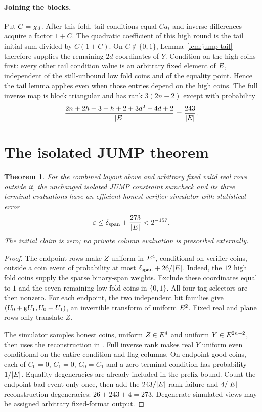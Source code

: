 \documentclass[11pt]{article}
\newtheorem{theorem}[lemma]{Theorem}
\begin{document}
\paragraph{Joining the blocks.} Put $C=\chi_d$. After this fold, tail conditions equal $C a_t$ and inverse differences acquire a factor $1+C$. The quadratic coefficient of this high round is the tail initial sum divided by $C(1+C)$. On $C\notin\{0,1\}$, Lemma~\ref{lem:jump-tail} therefore supplies the remaining $2d$ coordinates of $Y$. Condition on the high coins first: every other tail condition value is an arbitrary fixed element of $E$, independent of the still-unbound low fold coins and of the equality point. Hence the tail lemma applies even when those entries depend on the high coins. The full inverse map is block triangular and has rank $3(2n-2)$ except with probability
\[
 \frac{2n+2h+3+h+2+3d^2-4d+2}{|E|}
 =\frac{243}{|E|}.
\]

\section{The isolated JUMP theorem}

\begin{theorem}\label{thm:jump-padding}
For the combined layout above and arbitrary fixed valid real rows outside it, the unchanged isolated JUMP constraint sumcheck and its three terminal evaluations have an efficient honest-verifier simulator with statistical error
\[
 \varepsilon\le\delta_{\mathrm{span}}+\frac{273}{|E|}<2^{-157}.
\]
The initial claim is zero; no private column evaluation is prescribed externally.
\end{theorem}
\begin{proof}
The endpoint rows make $Z$ uniform in $E^4$, conditional on verifier coins, outside a coin event of probability at most $\delta_{\mathrm{span}}+26/|E|$. Indeed, the $12$ high fold coins supply the sparse binary-span weights. Exclude these coordinates equal to $1$ and the seven remaining low fold coins in $\{0,1\}$. All four tag selectors are then nonzero. For each endpoint, the two independent bit families give $(U_0+\mathsf{g} U_1,U_0+U_1)$, an invertible transform of uniform $E^2$. Fixed real and plane rows only translate $Z$.

The simulator samples honest coins, uniform $Z\in E^4$ and uniform $Y\in E^{2n-2}$, then uses the reconstruction in . Full inverse rank makes real $Y$ uniform even conditional on the entire condition and flag columns. On endpoint-good coins, each of $C_0=0$, $C_1=0$, $C_0=C_1$ and a zero terminal condition has probability $1/|E|$. Equality degeneracies are already included in the prefix bound. Count the endpoint bad event only once, then add the $243/|E|$ rank failure and $4/|E|$ reconstruction degeneracies: $26+243+4=273$. Degenerate simulated views may be assigned arbitrary fixed-format output.
\end{proof}
\end{document}
